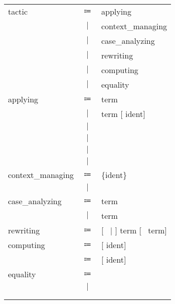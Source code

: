 \begin{table}[!htb]
    \centering\sl
    \begin{tabular}{lcl}
        tactic
            &$\Coloneqq$&applying\\
            &$\mid$&context\_managing\\
            &$\mid$&case\_analyzing\\
            &$\mid$&rewriting\\
            &$\mid$&computing\\
            &$\mid$&equality\\
        applying
            &$\Coloneqq$&\fexact{} term\\
            &$\mid$&\fapply{} term [\fin{} ident]\\
            &$\mid$&\fleft{}\\
            &$\mid$&\fright{}\\
            &$\mid$&\fsplit{}\\
            &$\mid$&\fexists{}\\
        context\_managing
            &$\Coloneqq$&\fintro{} \{ident\}\\
            &$\mid$&\fintros{}\\
        case\_analyzing
            &$\Coloneqq$&\fdestruct{} term\\
            &$\mid$&\finduction{} term\\
        rewriting
            &$\Coloneqq$&\frewrite{} [~\larrow{} $\mid$ \sarrow{}] term [~\fin{} term]\qquad\qquad\qquad\qquad\qquad\qquad\quad\\
        computing
            &$\Coloneqq$&\fsimpl{} [\fin{} ident]\\
            &$\Coloneqq$&\funfold{} [\fin{} ident]\\
        equality
            &$\Coloneqq$&\freflexivity{}\\
            &$\mid$&\fsymmetry{}\\\\\\
    \end{tabular}
\end{table}
